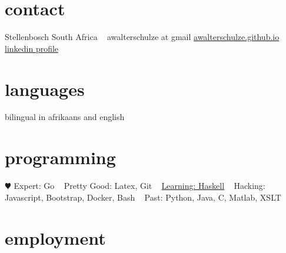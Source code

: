 \documentclass[]{friggeri-cv} %
\begin{document}

\begin{aside} %
\section{contact}
Stellenbosch
South Africa
~
awalterschulze at gmail
\href{http://awalterschulze.github.io}{awalterschulze.github.io}
\href{https://za.linkedin.com/in/schulzewalter}{linkedin profile}
\section{languages}
bilingual in afrikaans and english
\section{programming}
{\color{red} $\varheartsuit$} 
Expert: 
Go
~
Pretty Good: 
Latex, Git
~
\href{https://trello.com/b/ij35amXZ/mylearninghaskell}{Learning: Haskell}
~
Hacking:
Javascript, Bootstrap, Docker, Bash
~
Past:
Python, Java, C, Matlab, XSLT
\end{aside}

\section{employment}
\end{document}
